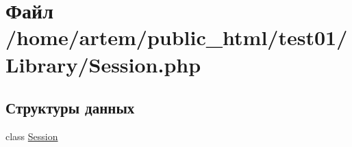 \hypertarget{_session_8php}{\section{Файл /home/artem/public\-\_\-html/test01/\-Library/\-Session.php}
\label{_session_8php}
}
\subsection*{Структуры данных}
\begin{DoxyCompactItemize}
\item 
class \hyperlink{class_session}{Session}
\end{DoxyCompactItemize}

